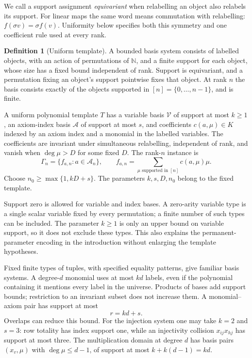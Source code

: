 \documentclass[11pt,a4paper]{article}
\theoremstyle{definition}\newtheorem{definition}[theorem]{Definition}
\theoremstyle{remark}\newtheorem{remark}[theorem]{Remark}
\newcommand{\NN}{\mathbb N}\newcommand{\N}{\mathbb N}\newcommand{\Z}{\mathbb Z}\newcommand{\Q}{\mathbb Q}\newcommand{\Fp}{\mathbb F_p}
\begin{document}
We call a support assignment \emph{equivariant} when relabelling an
object also relabels its support. For linear maps the same word means
commutation with relabelling: $f(\sigma v)=\sigma f(v)$. Uniformity
below specifies both this symmetry and one coefficient rule used at
every rank.

\begin{definition}[Uniform template]\label{def:template}
A bounded basis system consists of labelled objects, with an action of
permutations of $\NN$, and a finite support for each object, whose size
has a fixed bound independent of rank. Support is
equivariant, and a permutation fixing an object's support pointwise
fixes that object. At rank $n$ the basis consists exactly of the objects
supported in $[n]=\{0,\ldots,n-1\}$, and is finite.

A uniform polynomial template $T$ has a variable basis $\mathcal V$ of
support at most $k\ge1$, an axiom-index basis $\mathcal A$ of support at
most $s$, and coefficients $c(a,\mu)\in K$ indexed by an axiom index and
a monomial in the labelled variables. The coefficients are invariant
under simultaneous relabelling, independent of rank, and vanish when
$\deg\mu>D$ for some fixed $D$. The rank-$n$ instance is
\[
 \Gamma_n=\{f_{a,n}:a\in\mathcal A_n\},\qquad
 f_{a,n}=\sum_{\mu\text{ supported in }[n]}c(a,\mu)\mu.
\]
Choose $n_0\ge\max\{1,kD+s\}$. The parameters $k,s,D,n_0$ belong to
the fixed template.
\end{definition}

Support zero is allowed for variable and index bases. A zero-arity
variable type is a single scalar variable fixed by every permutation;
a finite number of such types can be included. The parameter $k\ge1$
is only an upper bound on variable support, so it does not exclude these
types. This also explains the permanent-parameter encoding in the
introduction without enlarging the template hypotheses.

Fixed finite types of tuples, with specified equality patterns, give
familiar basis systems. A degree-$d$ monomial uses at most $kd$ labels,
even if the polynomial containing it mentions every label in the
universe. Products of bases add support bounds; restriction to an
invariant subset does not increase them. A monomial--axiom pair has
support at most
\begin{equation}\label{eq:safe-budget}
                         r=kd+s.
\end{equation}
Overlaps can reduce this bound. For the injection system one may take
$k=2$ and $s=3$: row totality has index support one, while an
injectivity collision $x_{ij}x_{hj}$ has support at most three. The
multiplication domain at degree $d$ has basis pairs $(x_v,\mu)$ with
$\deg\mu\le d-1$, of support at most $k+k(d-1)=kd$.
\end{document}

